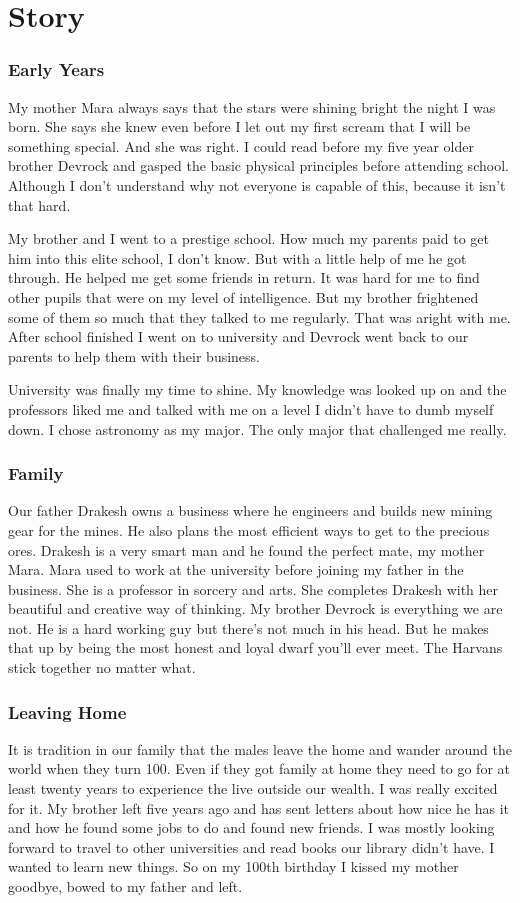\documentclass[letterpaper,10pt,twoside,twocolumn,openany]{book}
\begin{document}
	\section{Story}
		\subsubsection{Early Years}
		My mother Mara always says that the stars were shining bright the night I was born. She says she knew even before I let out my first scream that I will be something special. And she was right. I could read before my five year older brother Devrock and gasped the basic physical principles before attending school. Although I don't understand why not everyone is capable of this, because it isn't that hard. 
		
		My brother and I went to a prestige school. How much my parents paid to get him into this elite school, I don't know. But with a little help of me he got through. He helped me get some friends in return. It was hard for me to find other pupils that were on my level of intelligence. But my brother frightened some of them so much that they talked to me regularly. That was aright with me. After school finished I went on to university and Devrock went back to our parents to help them with their business. 
		
		University was finally my time to shine. My knowledge was looked up on and the professors liked me and talked with me on a level I didn't have to dumb myself down. I chose astronomy as my major. The only major that challenged me really.
		
		\subsubsection{Family} 
		Our father Drakesh owns a business where he engineers and builds new mining gear for the mines. He also plans the most efficient ways to get to the precious ores. Drakesh is a very smart man and he found the perfect mate, my mother Mara. Mara used to work at the university before joining my father in the business. She is a professor in sorcery and arts. She completes Drakesh with her beautiful and creative way of thinking. My brother Devrock is everything we are not. He is a hard working guy but there's not much in his head. But he makes that up by being the most honest and loyal dwarf you'll ever meet. The Harvans stick together no matter what. 
		
		\subsubsection{Leaving Home}
		It is tradition in our family that the males leave the home and wander around the world when they turn 100. Even if they got family at home they need to go for at least twenty years to experience the live outside our wealth. I was really excited for it. My brother left five years ago and has sent letters about how nice he has it and how he found some jobs to do and found new friends. I was mostly looking forward to travel to other universities and read books our library didn't have. I wanted to learn new things. So on my 100th birthday I kissed my mother goodbye, bowed to my father and left. 
		
\end{document}
